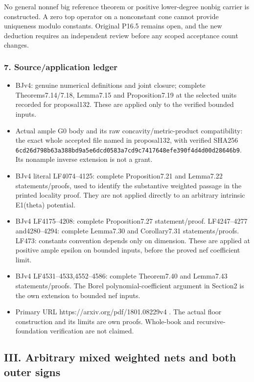 \documentclass[
  10pt,
]{article}
\providecommand{\tightlist}{%
  \setlength{\itemsep}{0pt}\setlength{\parskip}{0pt}}
\begin{document}
No general nonnef big reference theorem or positive lower-degree nonbig
carrier is constructed. A zero top operator on a nonconstant cone cannot
provide uniqueness modulo constants. Original P16.5 remains open, and
the new deduction requires an independent review before any scoped
acceptance count changes.

\subsubsection{7. Source/application
ledger}\label{sourceapplication-ledger-1}

\begin{itemize}
\tightlist
\item
  BJv4: genuine numerical definitions and joint closure; complete
  Theorems7.14/7.18, Lemma7.15 and Proposition7.19 at the selected units
  recorded for proposal132. These are applied only to the verified
  bounded inputs.
\item
  Actual ample G0 body and its raw concavity/metric-product
  compatibility: the exact whole accepted file named in proposal132,
  with verified SHA256
  \nolinkurl{6cd26d798b63a388bd9a5e6dcd0583a7cd9c7417648efe390f4d4d00d28646b9}. Its
  nonample inverse extension is not a grant.
\item
  BJv4 literal LF4074--4125: complete Proposition7.21 and Lemma7.22
  statements/proofs, used to identify the substantive weighted passage
  in the printed locality proof. They are not applied directly to an
  arbitrary intrinsic E1(theta) potential.
\item
  BJv4 LF4175--4208: complete Proposition7.27 statement/proof.
  LF4247--4277 and4280--4294: complete Lemma7.30 and Corollary7.31
  statements/proofs. LF473: constants convention depends only on
  dimension. These are applied at positive ample epsilon on bounded
  inputs, before the proved nef coefficient limit.
\item
  BJv4 LF4531--4533,4552--4586: complete Theorem7.40 and Lemma7.43
  statements/proofs. The Borel polynomial-coefficient argument in
  Section2 is the own extension to bounded nef inputs.
\item
  Primary URL https://arxiv.org/pdf/1801.08229v4 . The actual floor
  construction and its limits are own proofs. Whole-book and
  recursive-foundation verification are not claimed.
\end{itemize}

\subsection{III. Arbitrary mixed weighted nets and both outer
signs}\label{iii.-arbitrary-mixed-weighted-nets-and-both-outer-signs}
\end{document}
